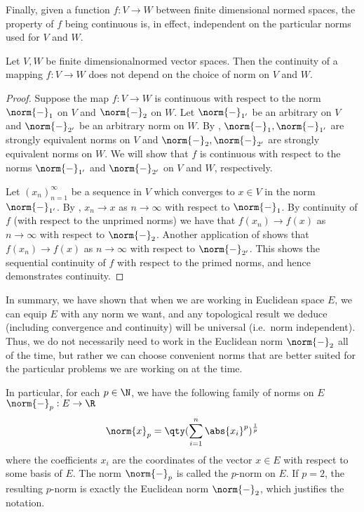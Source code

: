  Finally, given a function \( f:V \to W \) between finite dimensional normed spaces, the property of \( f \) being continuous is, in effect, independent on the particular norms used for \( V \) and \( W \).
 \begin{proposition}
   Let \( V,W \) be finite dimensionalnormed vector spaces. Then the continuity of a mapping \( f:V\to W \) does not depend on the choice of norm on \( V \) and \( W \).
 \end{proposition}
 \begin{proof}
   Suppose the map \( f:V\to W \) is continuous with respect to the norm \( \norm{-}_1 \) on \( V \) and \( \norm{-}_2 \) on \( W \). Let \( \norm{-}_{1'} \) be an arbitrary on \( V \) and \( \norm{-}_{2'} \) be an arbitrary norm on \( W \). By , \( \norm{-}_1,\norm{-}_{1'} \) are strongly equivalent norms on \( V \) and \( \norm{-}_2,\norm{-}_{2'} \) are strongly equivalent norms on \( W \). We will show that \( f \) is continuous with respect to the norms \( \norm{-}_{1'} \) and \( \norm{-}_{2'} \) on \( V \) and \( W \), respectively.

   \vspace{3mm}

   Let \( (x_n)_{n=1}^\infty \) be a sequence in \( V \) which converges to \( x\in V \) in the norm \( \norm{-}_{1'} \). By , \( x_n\to x \) as \( n\to\infty \) with respect to \( \norm{-}_1 \). By continuity of \( f \) (with respect to the unprimed norms) we have that \( f(x_n)\to f(x) \) as \( n\to\infty \) with respect to \( \norm{-}_2 \). Another application of  shows that \( f(x_n)\to f(x) \) as \( n\to\infty \) with respect to \( \norm{-}_{2'} \). This shows the sequential continuity of \( f \) with respect to the primed norms, and hence demonstrates continuity.
 \end{proof}

 In summary, we have shown that when we are working in Euclidean space \( E \), we can equip \( E \) with any norm we want, and any topological result we deduce (including convergence and continuity) will be universal (i.e.\ norm independent). Thus, we do not necessarily need to work in the Euclidean norm \( \norm{-}_2 \) all of the time, but rather we can choose convenient norms that are better suited for the particular problems we are working on at the time.

 \vspace{3mm}

 In particular, for each \( p\in\N \), we have the following family of norms on \( E \) \( \norm{-}_p:E\to\R \)
 \[ \norm{x}_p=\qty(\sum_{i=1}^n\abs{x_i}^p)^{\frac{1}{p}} \]
 where the coefficients \( x_i \) are the coordinates of the vector \( x\in E \) with respect to some basis of \( E \). The norm \( \norm{-}_p \) is called the \( p \)-norm on \( E \). If \( p=2 \), the resulting \( p \)-norm is exactly the Euclidean norm \( \norm{-}_2 \), which justifies the notation.

